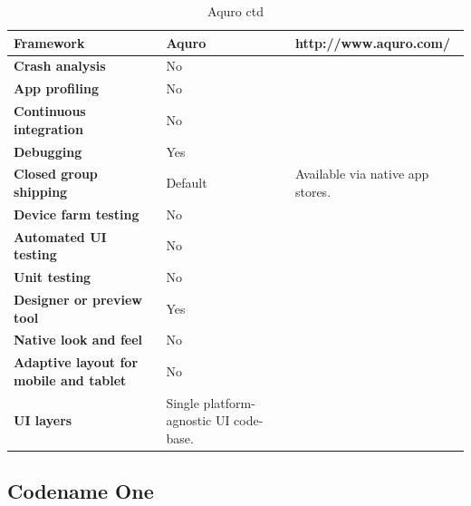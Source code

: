 \documentclass[english,master,public,dept460,male,cpdeclaration,oneside]{diploma}
\begin{document}
\begin{table}[!h]
	\centering
	\caption{Aquro ctd}
	\begin{tabular}{p{} | p{} | p{}}
		\toprule		
		\textbf{Framework} & \textbf{Aquro} & http://www.aquro.com/ \\
		\midrule
		\textbf{Crash analysis} & No &  \\			
		\midrule
		\textbf{App profiling} & No & \\			
		\midrule
		\textbf{Continuous integration} & No & \\			
		\midrule
		\textbf{Debugging} & Yes & \\			
		\midrule
		\textbf{Closed group shipping} & Default & Available via native app stores. \\			
		\midrule
		\textbf{Device farm testing} & No & \\
		\midrule
		\textbf{Automated UI testing} & No & \\			
		\midrule
		\textbf{Unit testing} & No & \\			
		\midrule
		\textbf{Designer or preview tool} & Yes & \\			
		\midrule
		\textbf{Native look and feel} & No & \\			
		\midrule
		\textbf{Adaptive layout for mobile and tablet} & No & \\			
		\midrule		
		\textbf{UI layers} & Single platform-agnostic UI code-base. &  \\			
		\midrule
	\end{tabular}
\end{table}

\clearpage
\subsection{Codename One}
\end{document}
